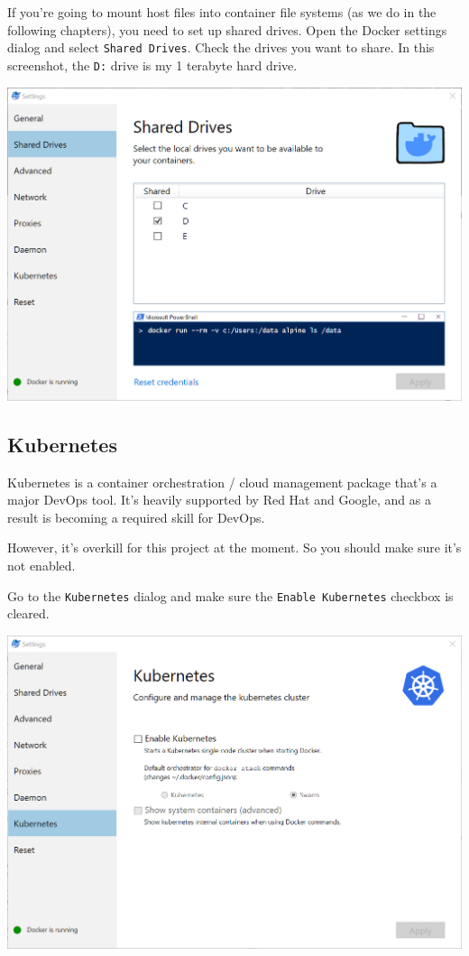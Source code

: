\documentclass[]{book}
\theoremstyle{definition}
\theoremstyle{definition}
\theoremstyle{definition}
\theoremstyle{remark}
\begin{document}
If you're going to mount host files into container file systems (as we
do in the following chapters), you need to set up shared drives. Open
the Docker settings dialog and select \texttt{Shared\ Drives}. Check the
drives you want to share. In this screenshot, the \texttt{D:} drive is
my 1 terabyte hard drive.

\begin{center}\includegraphics[width=0.9\linewidth]{screenshots/2018-08-26_15_16_51-Shared_Drives} \end{center}

\hypertarget{kubernetes}{%
\subsection{Kubernetes}\label{kubernetes}}

Kubernetes is a container orchestration / cloud management package
that's a major DevOps tool. It's heavily supported by Red Hat and
Google, and as a result is becoming a required skill for DevOps.

However, it's overkill for this project at the moment. So you should
make sure it's not enabled.

Go to the \texttt{Kubernetes} dialog and make sure the
\texttt{Enable\ Kubernetes} checkbox is cleared.

\begin{center}\includegraphics[width=0.9\linewidth]{screenshots/2018-08-26_15_26_22-Kubernetes} \end{center}
\end{document}
